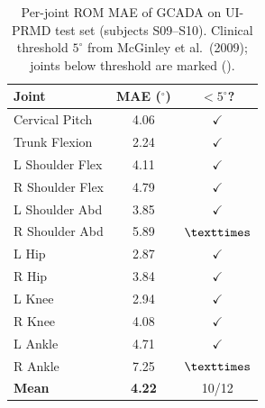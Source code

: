\begin{table}[ht]
\centering
\caption{Per-joint ROM MAE of GCADA on UI-PRMD test set
(subjects S09--S10). Clinical threshold $5^\circ$ from
McGinley et al.\ (2009); joints below threshold are marked (\checkmark).}
\label{tab:per_joint_mae}
\begin{tabular}{|l|c|c|}
\hline
\textbf{Joint} & \textbf{MAE ($^\circ$)} & \textbf{$<5^\circ$?} \\
\hline
    Cervical Pitch         & 4.06 & $\checkmark$ \\
    Trunk Flexion          & 2.24 & $\checkmark$ \\
    L Shoulder Flex        & 4.11 & $\checkmark$ \\
    R Shoulder Flex        & 4.79 & $\checkmark$ \\
    L Shoulder Abd         & 3.85 & $\checkmark$ \\
    R Shoulder Abd         & 5.89 & $\texttimes$ \\
    L Hip                  & 2.87 & $\checkmark$ \\
    R Hip                  & 3.84 & $\checkmark$ \\
    L Knee                 & 2.94 & $\checkmark$ \\
    R Knee                 & 4.08 & $\checkmark$ \\
    L Ankle                & 4.71 & $\checkmark$ \\
    R Ankle                & 7.25 & $\texttimes$ \\
\hline
    \textbf{Mean} & \textbf{4.22} & 10/12 \\
\hline
\end{tabular}
\end{table}
